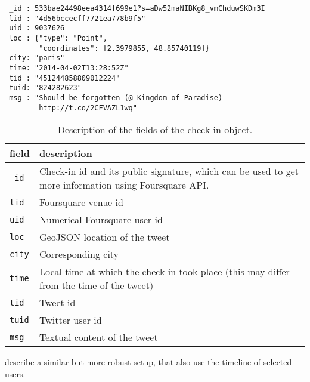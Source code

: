 \begin{verbatim}
 _id : 533bae24498eea4314f699e1?s=aDw52maNIBKg8_vmChduwSKDm3I
 lid : "4d56bccecff7721ea778b9f5"
 uid : 9037626
 loc : {"type": "Point",
        "coordinates": [2.3979855, 48.85740119]}
 city: "paris"
 time: "2014-04-02T13:28:52Z"
 tid : "451244858809012224"
 tuid: "824282623"
 msg : "Should be forgotten (@ Kingdom of Paradise)
        http://t.co/2CFVAZL1wq"
\end{verbatim}

\begin{table}[ht]
    \centering
    \begin{tabularx}{\textwidth}{lX}
        \toprule
        field & description \\
        \midrule
        \texttt{\_id} & Check-in id and its public signature, which can be used
        to get more information using Foursquare API. \\
        \texttt{lid} & Foursquare venue id \\
        \texttt{uid} & Numerical Foursquare user id \\
        \texttt{loc} & GeoJSON location of the tweet \\
        \texttt{city} & Corresponding city \\
        \texttt{time} & Local time at which the check-in took place (this may differ from the time of the tweet) \\
        \texttt{tid} & Tweet id \\
        \texttt{tuid} & Twitter user id \\
        \texttt{msg} & Textual content of the tweet \\
        \bottomrule
    \end{tabularx}
    \caption[Check-in format]{Description of the fields of the check-in
    object.\label{tab:checkinfields}}
\end{table}

\Textcite{TwitterMongoDB13} describe a similar but more robust setup, that
also use the timeline of selected users.


